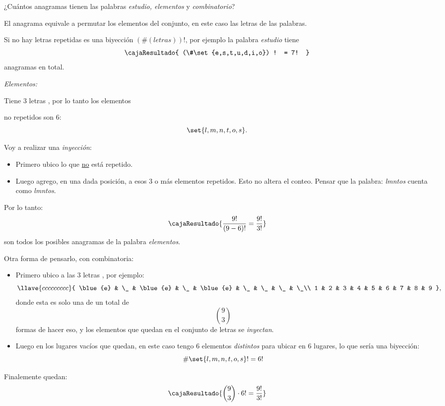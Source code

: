 \begin{enunciado}{\ejercicio}
	¿Cuántos anagramas tienen las palabras \textit{estudio, elementos} y \textit{combinatorio}?
\end{enunciado}

El anagrama equivale a permutar los elementos del conjunto, en este caso las letras de las palabras.

Si no hay letras repetidas es una biyección $(\#(letras))!$, por ejemplo la palabra \textit{estudio} tiene
$$
	\cajaResultado{
            (\#\set{e,s,t,u,d,i,o}) ! = 7!
	}
$$
anagramas en total.

\bigskip

\textit{Elementos:}

Tiene 3 letras \textit{}, por lo tanto los elementos

no repetidos son 6:
$$
	\set{l,m,n,t,o,s}.
$$

Voy a realizar una \textit{inyección}:
\begin{itemize}
	\item Primero ubico lo que \underline{no} está repetido.
	\item Luego agrego, en una dada posición, a esos 3 o más elementos repetidos. Esto
	      no altera el conteo. Pensar que la palabra: \textit{lmntos}
	      cuenta como \textit{lmntos\blue{\_}\blue{\_}\blue{\_}}.
\end{itemize}
Por lo tanto:
$$
	\cajaResultado{
		\frac{9!}{(9-6)!} = \frac{9!}{3!}
	}
$$
son todos los posibles anagramas de la palabra \textit{elementos}.

Otra forma de pensarlo, con combinatoria:
\begin{itemize}
	\item Primero ubico a las 3 letras \textit{}, por ejemplo:
	      $$
		      \llave{c c c c c c c c c} {
			      \blue{e} & \_ & \blue{e} & \_ & \blue{e} & \_ & \_ & \_ & \_\\
			      1 & 2 & 3 & 4 & 5 & 6 & 7 & 8 & 9
		      },
	      $$
	      donde esta es solo una de un total de
	      $$
		      \binom{9}{3}
	      $$
	      formas de hacer eso, y los elementos que quedan en el conjunto de letras se \textit{inyectan}.

	\item
	      Luego en los lugares vacíos que quedan, en este caso tengo 6 elementos \textit{distintos}
	      para ubicar en 6 lugares, lo que sería una biyección:
	      $$
		      \#\set{l,m,n,t,o,s}! =  6!
	      $$
\end{itemize}
Finalemente quedan:
$$
	\cajaResultado{
		\binom{9}{3} \cdot 6!  = \frac{9!}{3!}
	}
$$


